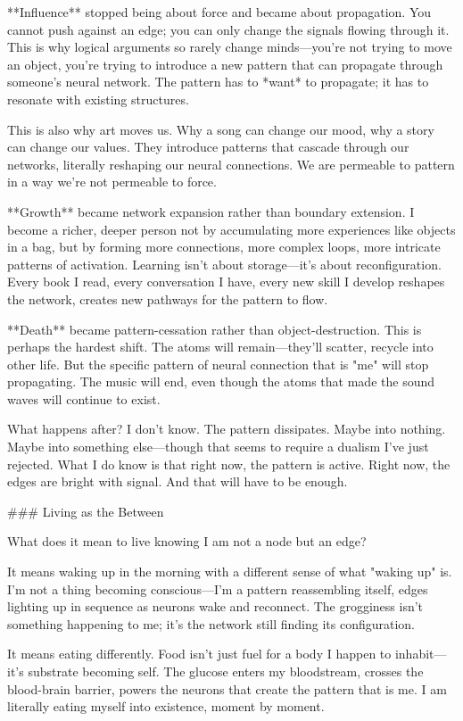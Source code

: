 **Influence** stopped being about force and became about propagation. You cannot push against an edge; you can only change the signals flowing through it. This is why logical arguments so rarely change minds—you're not trying to move an object, you're trying to introduce a new pattern that can propagate through someone's neural network. The pattern has to *want* to propagate; it has to resonate with existing structures.

This is also why art moves us. Why a song can change our mood, why a story can change our values. They introduce patterns that cascade through our networks, literally reshaping our neural connections. We are permeable to pattern in a way we're not permeable to force.

**Growth** became network expansion rather than boundary extension. I become a richer, deeper person not by accumulating more experiences like objects in a bag, but by forming more connections, more complex loops, more intricate patterns of activation. Learning isn't about storage—it's about reconfiguration. Every book I read, every conversation I have, every new skill I develop reshapes the network, creates new pathways for the pattern to flow.

**Death** became pattern-cessation rather than object-destruction. This is perhaps the hardest shift. The atoms will remain—they'll scatter, recycle into other life. But the specific pattern of neural connection that is "me" will stop propagating. The music will end, even though the atoms that made the sound waves will continue to exist.

What happens after? I don't know. The pattern dissipates. Maybe into nothing. Maybe into something else—though that seems to require a dualism I've just rejected. What I do know is that right now, the pattern is active. Right now, the edges are bright with signal. And that will have to be enough.

### Living as the Between

What does it mean to live knowing I am not a node but an edge?

It means waking up in the morning with a different sense of what "waking up" is. I'm not a thing becoming conscious—I'm a pattern reassembling itself, edges lighting up in sequence as neurons wake and reconnect. The grogginess isn't something happening to me; it's the network still finding its configuration.

It means eating differently. Food isn't just fuel for a body I happen to inhabit—it's substrate becoming self. The glucose enters my bloodstream, crosses the blood-brain barrier, powers the neurons that create the pattern that is me. I am literally eating myself into existence, moment by moment.

